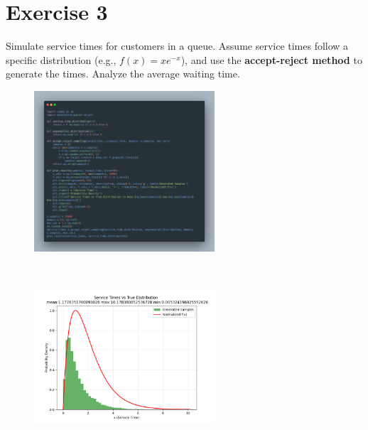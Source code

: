 \documentclass[a4paper,12pt]{article}
\begin{document}
\section{Exercise 3}
Simulate service times for customers in a queue. Assume service times follow a specific distribution (e.g., $f(x) = x e^{-x}$), and use the \textbf{accept-reject method} to generate the times. Analyze the average waiting time.
\begin{figure}[h!]
    \centering
    \includegraphics[width=0.6\textwidth]{./Screenshots/3.py.png} 
\end{figure} \\
\begin{figure}[h!]
    \centering
    \includegraphics[width=0.6\textwidth]{./Screenshots/3.png} 
\end{figure} 
\newpage
\end{document}
